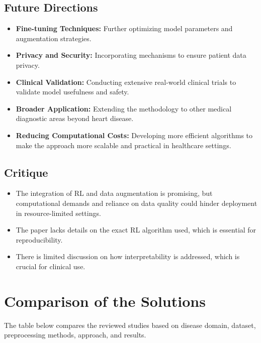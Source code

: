 \subsection*{Future Directions}
\begin{itemize}
    \item \textbf{Fine-tuning Techniques:} Further optimizing model parameters and augmentation strategies.
    \item \textbf{Privacy and Security:} Incorporating mechanisms to ensure patient data privacy.
    \item \textbf{Clinical Validation:} Conducting extensive real-world clinical trials to validate model usefulness and safety.
    \item \textbf{Broader Application:} Extending the methodology to other medical diagnostic areas beyond heart disease.
    \item \textbf{Reducing Computational Costs:} Developing more efficient algorithms to make the approach more scalable and practical in healthcare settings.
\end{itemize}

\subsection*{Critique}
\begin{itemize}
    \item The integration of RL and data augmentation is promising, but computational demands and reliance on data quality could hinder deployment in resource-limited settings.
    \item The paper lacks details on the exact RL algorithm used, which is essential for reproducibility.
    \item There is limited discussion on how interpretability is addressed, which is crucial for clinical use.
\end{itemize}

\section{Comparison of the Solutions}
The table below compares the reviewed studies based on disease domain, dataset, preprocessing methods, approach, and results.

